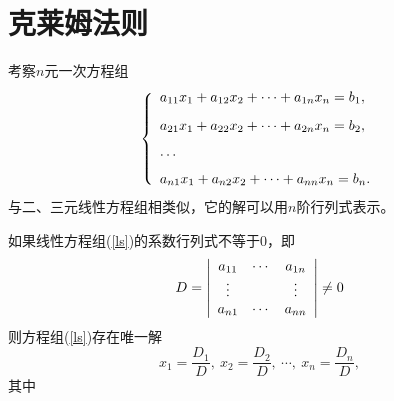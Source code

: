 \section{克莱姆法则}
\begin{frame}
考察$n$元一次方程组
\begin{equation}\label{ls}
  \left\{
    \begin{array}{l}
      a_{11}x_1 + a_{12}x_2 + \cdots + a_{1n}x_n = b_1, \\[0.3cm]
      a_{21}x_1 + a_{22}x_2 + \cdots + a_{2n}x_n = b_2, \\[0.3cm]
      \cdots \\[0.2cm]
      a_{n1}x_1 + a_{n2}x_2 + \cdots + a_{nn}x_n = b_n.
    \end{array}
  \right.
\end{equation}
与二、三元线性方程组相类似，它的解可以用$n$阶行列式表示。
\end{frame}

\begin{frame}
\begin{dingli}[克莱姆法则]
  如果线性方程组(\ref{ls})的系数行列式不等于0，即
  $$
  D = \left|
    \begin{array}{ccc}
      a_{11}  & \cdots  & a_{1n} \\
      \vdots    &      & \vdots  \\
      a_{n1}  & \cdots  & a_{nn}
    \end{array}
  \right|\ne 0
  $$
  则方程组(\ref{ls})存在唯一解
  $$
  x_1 = \frac{D_1}D, \ x_2 = \frac{D_2} D, \ \cdots, \ x_n = \frac{D_n}D,
  $$
  其中
  \begin{center}
  \end{center}
\end{dingli}
\end{frame}

